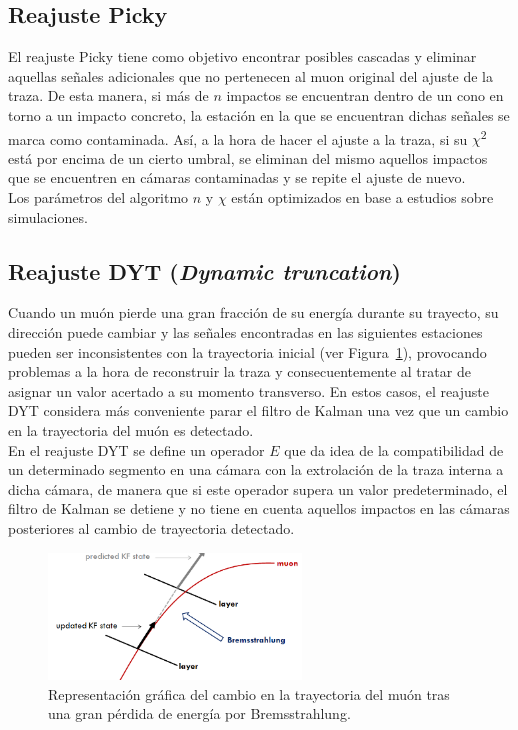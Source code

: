 \subsection{Reajuste Picky}\label{sec:Picky}

El reajuste Picky tiene como objetivo encontrar posibles cascadas y eliminar aquellas se\~nales adicionales que no pertenecen al muon original del ajuste de la traza. De esta manera, si m\'as de $n$ impactos se encuentran dentro de un cono en torno a un impacto concreto, la estaci\'on en la que se encuentran dichas se\~nales se marca como contaminada. As\'i, a la hora de hacer el ajuste a la traza, si su $\chi$\textsuperscript{2} est\'a por encima de un cierto umbral, se eliminan del mismo aquellos impactos que se encuentren en c\'amaras contaminadas y se repite el ajuste de nuevo. \\
Los par\'ametros del algoritmo $n$ y $\chi$ est\'an optimizados en base a estudios sobre simulaciones.

\subsection{Reajuste DYT (\textit{Dynamic truncation})}\label{sec:DYT}

Cuando un mu\'on pierde una gran fracci\'on de su energ\'ia durante su trayecto, su direcci\'on puede cambiar y las se\~nales encontradas en las siguientes estaciones pueden ser inconsistentes con la trayectoria inicial (ver Figura~\ref{fig:energyloss}), provocando problemas a la hora de reconstruir la traza y consecuentemente al tratar de asignar un valor acertado a su momento transverso. En estos casos, el reajuste DYT considera m\'as conveniente parar el filtro de Kalman una vez que un cambio en la trayectoria del mu\'on es detectado. \\
En el reajuste DYT se define un operador $E$ que da idea de la compatibilidad de un determinado segmento en una c\'amara con la extrolaci\'on de la traza interna a dicha c\'amara, de manera que si este operador supera un valor predeterminado, el filtro de Kalman se detiene y no tiene en cuenta aquellos impactos en las c\'amaras posteriores al cambio de trayectoria detectado. 

\begin{figure}[h]
\centering
\includegraphics[width=0.60\textwidth]{figures/energyloss.png}
\caption{Representaci\'on gr\'afica del cambio en la trayectoria del mu\'on tras una gran p\'erdida de energ\'ia por Bremsstrahlung.}
\label{fig:energyloss}        
\end{figure}


